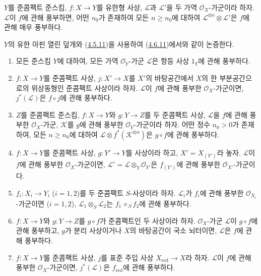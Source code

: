 \begin{corollary}[4.6.12]
\label{II.4.6.12-ko}
$Y$를 준콤팩트 준스킴, $f:X\to Y$를 유한형 사상,
$\mathcal{L}$과 $\mathcal{L}'$을 두 가역 $\mathcal{O}_X$-가군이라
하자. $\mathcal{L}$이 $f$에 관해 풍부하면, 어떤 $n_0$가 존재하여
모든 $n\geq n_0$에 대하여
$\mathcal{L}^{\otimes n}\otimes\mathcal{L}'$은 $f$에 관해 매우
풍부하다.
\end{corollary}

$Y$의 유한 아핀 열린 덮개와
(\hyperref[II.4.5.11-ko]{4.5.11})을 사용하여
(\hyperref[II.4.6.11-ko]{4.6.11})에서와 같이 논증한다.

\begin{proposition}[4.6.13]
\label{II.4.6.13-ko}
\begin{enumerate}
  \item[\rm{(i)}] 모든 준스킴 $Y$에 대하여, 모든 가역
  $\mathcal{O}_Y$-가군 $\mathcal{L}$은 항등 사상 $1_Y$에 관해
  풍부하다.
  \item[\rm{(i bis)}] $f:X\to Y$를 준콤팩트 사상,
  $j:X'\to X$를 $X'$의 바탕공간에서 $X$의 한 부분공간으로의
  위상동형인 준콤팩트 사상이라 하자. $\mathcal{L}$이 $f$에 관해
  풍부한 $\mathcal{O}_X$-가군이면, $j^*(\mathcal{L})$은
  $f\circ j$에 관해 풍부하다.
  \item[\rm{(ii)}] $Z$를 준콤팩트 준스킴, $f:X\to Y$와
  $g:Y\to Z$를 두 준콤팩트 사상, $\mathcal{L}$을 $f$에 관해 풍부한
  $\mathcal{O}_X$-가군, $\mathcal{K}$를 $g$에 관해 풍부한
  $\mathcal{O}_Y$-가군이라 하자. 어떤 정수 $n_0>0$가 존재하여,
  모든 $n\geq n_0$에 대하여
  $\mathcal{L}\otimes f^*(\mathcal{K}^{\otimes n})$은
  $g\circ f$에 관해 풍부하다.
  \item[\rm{(iii)}] $f:X\to Y$를 준콤팩트 사상,
  $g:Y'\to Y$를 사상이라 하고, $X'=X_{(Y')}$라 놓자.
  $\mathcal{L}$이 $f$에 관해 풍부한 $\mathcal{O}_X$-가군이면,
  $\mathcal{L}'=\mathcal{L}\otimes_Y\mathcal{O}_{Y'}$은
  $f_{(Y')}$에 관해 풍부한 $\mathcal{O}_{X'}$-가군이다.
  \item[\rm{(iv)}] $f_i:X_i\to Y_i$ ($i=1,2$)를 두 준콤팩트
  $S$-사상이라 하자. $\mathcal{L}_i$가 $f_i$에 관해 풍부한
  $\mathcal{O}_{X_i}$-가군이면 ($i=1,2$),
  $\mathcal{L}_1\otimes_S\mathcal{L}_2$는
  $f_1\times_S f_2$에 관해 풍부하다.
  \item[\rm{(v)}] $f:X\to Y$와 $g:Y\to Z$를 $g\circ f$가
  준콤팩트인 두 사상이라 하자. $\mathcal{O}_X$-가군
  $\mathcal{L}$이 $g\circ f$에 관해 풍부하고, $g$가 분리 사상이거나
  $X$의 바탕공간이 국소 뇌터이면, $\mathcal{L}$은 $f$에 관해
  풍부하다.


  \item[\rm{(vi)}] $f:X\to Y$를 준콤팩트 사상,
  $j$를 표준 주입 사상 $X_{\mathrm{red}}\to X$라 하자.
  $\mathcal{L}$이 $f$에 관해 풍부한 $\mathcal{O}_X$-가군이면,
  $j^*(\mathcal{L})$은 $f_{\mathrm{red}}$에 관해 풍부하다.
\end{enumerate}
\end{proposition}

